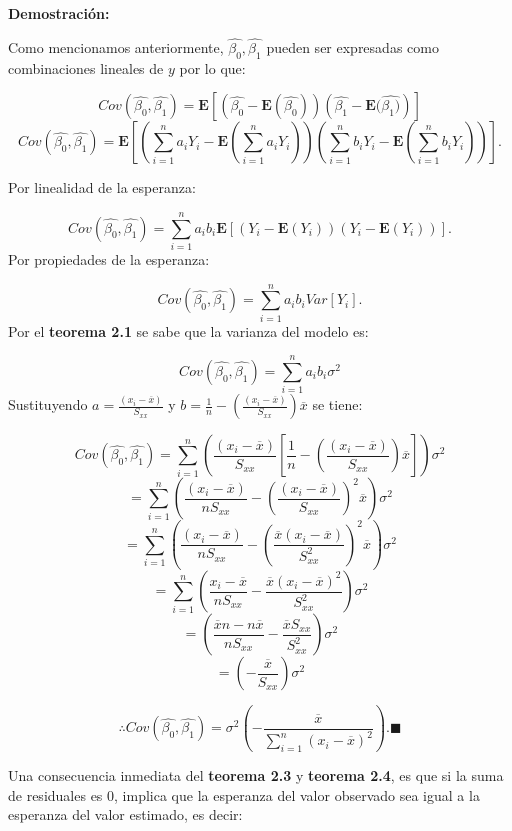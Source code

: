 \documentclass[
  a4paper,
  oneside,
  openany]{book}
\begin{document}
\textbf{Demostración:}

Como mencionamos anteriormente, \(\hat{\beta_{0}},\hat{\beta_{1}}\) pueden ser expresadas como combinaciones lineales de \(y\) por lo que:

\[Cov\left(\hat{\beta_{0}},\hat{\beta_{1}} \right)= \mathbf{E}\left[ \left( \hat{\beta_{0}}-\mathbf{E}(\hat{\beta_{0}})\right)\left(\hat{\beta_{1}}-\mathbf{E}(\hat{\beta_{1})} \right) \right]\]
\[Cov\left(\hat{\beta_{0}},\hat{\beta_{1}} \right)= \mathbf{E}\left[\left(\sum_{i=1}^{n}a_{i}Y_{i}-\mathbf{E}(\sum_{i=1}^{n}a_{i}Y_{i}) \right)\left(\sum_{i=1}^{n}b_{i}Y_{i}-\mathbf{E}(\sum_{i=1}^{n}b_{i}Y_{i}) \right)\right].\]

Por linealidad de la esperanza:

\[Cov\left(\hat{\beta_{0}},\hat{\beta_{1}}\right)=\sum_{i=1}^{n}a_{i}b_{i}\mathbf{E}[(Y_{i}-\mathbf{E}(Y_{i}))(Y_{i}-\mathbf{E}(Y_{i}))].\]
Por propiedades de la esperanza:

\[Cov\left(\hat{\beta_{0}},\hat{\beta_{1}}\right)=\sum_{i=1}^{n}a_{i}b_{i}Var[Y_{i}].\]
Por el \textbf{teorema 2.1} se sabe que la varianza del modelo es:

\[Cov\left(\hat{\beta_{0}},\hat{\beta_{1}}\right)=\sum_{i=1}^{n}a_{i}b_{i}\sigma^2\]
Sustituyendo \(a=\frac{(x_{i}-\overline{x})}{S_{xx}}\) y \(b=\frac{1}{n}-\left(\frac{(x_{i}-\overline{x})}{S_{xx}}\right)\overline{x}\) se tiene:

\[Cov\left(\hat{\beta_{0}},\hat{\beta_{1}}\right)=\sum_{i=1}^{n}\left(\frac{(x_{i}-\overline{x})}{S_{xx}}\left[\frac{1}{n}-\left(\frac{(x_{i}-\overline{x})}{S_{xx}}\right)\overline{x}\right]\right)\sigma^2\]
\[=\sum_{i=1}^{n}\left(\frac{(x_{i}-\overline{x})}{nS_{xx}}-\left(\frac{(x_{i}-\overline{x})}{S_{xx}}\right)^2\overline{x}\right)\sigma^2\]
\[=\sum_{i=1}^{n}\left(\frac{(x_{i}-\overline{x})}{nS_{xx}}-\left(\frac{\overline{x}(x_{i}-\overline{x})}{S^2_{xx}}\right)^2\overline{x}\right)\sigma^2\]
\[=\sum_{i=1}^{n}\left(\frac{x_{i}-\overline{x}}{nS_{xx}}-\frac{\overline{x}(x_{i}-\overline{x})^2}{S^2_{xx}}\right)\sigma^2\]
\[=\left(\frac{\overline{x}n -n\overline{x}}{nS_{xx}}-\frac{\overline{x}S_{xx}}{S^2_{xx}}\right)\sigma^2\]
\[=\left(-\frac{\overline{x}}{S_{xx}}\right)\sigma^2\]

\[\therefore Cov\left(\hat{\beta_{0}},\hat{\beta_{1}}\right)=\sigma^2\left(-\frac{\overline{x}}{\sum_{i=1}^{n}(x_{i}-\overline{x})^2}\right).\blacksquare\]

Una consecuencia inmediata del \textbf{teorema 2.3} y \textbf{teorema 2.4}, es que si la suma de residuales es 0, implica que la esperanza del valor observado sea igual a la esperanza del valor estimado, es decir:
\end{document}
